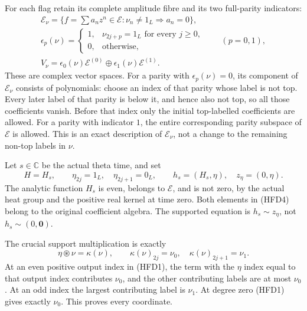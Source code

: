 For each flag retain its complete amplitude fibre and its
two full-parity indicators:
\begin{equation}\tag{HFD3}
 \begin{gathered}
 \mathcal E_\nu
    =\{f=\sum a_nz^n\in\mathcal E:
                       \nu_n\ne1_L\Longrightarrow a_n=0\},\\
 \epsilon_p(\nu)=
  \begin{cases}1,&\nu_{2j+p}=1_L\text{ for every }j\ge0,\\
                0,&\text{otherwise},
  \end{cases}
       \qquad(p=0,1),\\
 V_\nu=\epsilon_0(\nu)\mathcal E^{(0)}
                  \oplus\epsilon_1(\nu)\mathcal E^{(1)}.
 \end{gathered}
\end{equation}
These are complex vector spaces. For a parity with
$\epsilon_p(\nu)=0$, its component of $\mathcal E_\nu$
consists of polynomials: choose an index of that parity
whose label is not top. Every later label of that parity
is below it, and hence also not top, so all those
coefficients vanish. Before that index only the initial
top-labelled coefficients are allowed. For a parity
with indicator $1$, the entire corresponding parity
subspace of $\mathcal E$ is allowed. This is an exact
description of $\mathcal E_\nu$, not a change to the
remaining non-top labels in $\nu$.

Let $s\in\mathbb C$ be the actual theta time, and set
\begin{equation}\tag{HFD4}
 H=H_s,\qquad
 \eta_{2j}=1_L,\quad\eta_{2j+1}=0_L,\qquad
 h_s=(H_s,\eta),\quad z_\eta=(0,\eta).
\end{equation}
The analytic function $H_s$ is even, belongs to $\mathcal E$,
and is not zero, by the actual heat group and the positive
real kernel at time zero.
Both elements in (HFD4) belong to the original coefficient
algebra. The supported equation is $h_s\sim z_\eta$,
not $h_s\sim(0,\mathbf0)$.

The crucial support multiplication is exactly
\begin{equation}\tag{HFD5}
 \eta\circledast\nu=\kappa(\nu),\qquad
 \kappa(\nu)_{2j}=\nu_0,\quad
 \kappa(\nu)_{2j+1}=\nu_1 .
\end{equation}
At an even positive output index in (HFD1), the term
with the $\eta$ index equal to that output index
contributes $\nu_0$, and the other contributing labels
are at most $\nu_0$. At an odd index the largest
contributing label is $\nu_1$. At degree zero (HFD1)
gives exactly $\nu_0$. This proves every coordinate.

